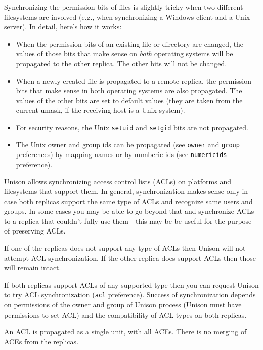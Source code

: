 \documentclass{article}
\begin{document}

Synchronizing the permission bits of files is slightly tricky when two
different filesystems are involved (e.g., when synchronizing a Windows
client and a Unix server).  In detail, here's how it works:
\begin{itemize}
\item When the permission bits of an existing file or directory are
changed, the values of those bits that make sense on {\em both}
operating systems will be propagated to the other replica.  The other
bits will not be changed.
\item When a newly created file is propagated to a remote replica, the
permission bits that make sense in both operating systems are also
propagated.  The values of the other bits are set to default values
(they are taken from the current umask, if the receiving host is a
Unix system).
\item For security reasons, the Unix \verb|setuid| and \verb|setgid|
bits are not propagated.
\item The Unix owner and group ids can be propagated (see \verb|owner|
and \verb|group| preferences) by mapping names or by numberic ids (see
\verb|numericids| preference).
\end{itemize}


Unison allows synchronizing access control lists (ACLs) on platforms
and filesystems that support them. In general, synchronization makes
sense only in case both replicas support the same type of ACLs and
recognize same users and groups. In some cases you may be able to
go beyond that and synchronize ACLs to a replica that couldn't fully
use them---this may be be useful for the purpose of preserving ACLs.

If one of the replicas does not support any type of ACLs then
Unison will not attempt ACL synchronization. If the other replica
does support ACLs then those will remain intact.

If both replicas support ACLs of any supported type then you can
request Unison to try ACL synchronization (\verb|acl| preference).
Success of synchronization depends on permissions of the owner and
group of Unison process (Unison must have permissions to set ACL)
and the compatibility of ACL types on both replicas.

An ACL is propagated as a single unit, with all ACEs. There is no
merging of ACEs from the replicas.
\end{document}
